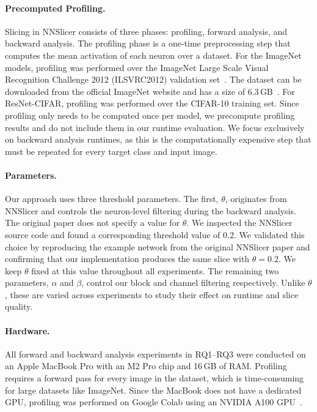 \documentclass[
12pt,
fancyheadings,
a4paper,
twoside,
BCOR=0.7cm,
nobcorignoretitle,
grayscalebody,
]{stsreprt}
\begin{document}
\paragraph{Precomputed Profiling.}
Slicing in NNSlicer consists of three phases: profiling, forward analysis, and backward analysis.
The profiling phase is a one-time preprocessing step that computes the mean activation of each
neuron over a dataset.
For the ImageNet models, profiling was performed over the ImageNet Large Scale Visual Recognition
Challenge 2012 (ILSVRC2012) validation set~\cite{deng2009imagenet, russakovsky2015imagenet}.
The dataset can be downloaded from the official ImageNet website and has a size of
6.3\,GB~\cite{imagenet2012}.
For ResNet-CIFAR, profiling was performed over the CIFAR-10 training set.
Since profiling only needs to be computed once per model, we precompute profiling results and do
not include them in our runtime evaluation.
We focus exclusively on backward analysis runtimes, as this is the computationally expensive step
that must be repeated for every target class and input image.

\paragraph{Parameters.}
Our approach uses three threshold parameters.
The first, $\theta$, originates from NNSlicer and controls the neuron-level filtering during the
backward analysis.
The original paper does not specify a value for $\theta$.
We inspected the NNSlicer source code and found a corresponding threshold value of $0.2$.
We validated this choice by reproducing the example network from the original NNSlicer paper and
confirming that our implementation produces the same slice with $\theta = 0.2$.
We keep $\theta$ fixed at this value throughout all experiments.
The remaining two parameters, $\alpha$ and $\beta$, control our block and channel filtering
respectively.
Unlike $\theta$, these are varied across experiments to study their effect on runtime and slice
quality.

\paragraph{Hardware.}
All forward and backward analysis experiments in RQ1--RQ3 were conducted on an Apple MacBook Pro
with an M2 Pro chip and 16\,GB of RAM.
Profiling requires a forward pass for every image in the dataset, which is time-consuming for large
datasets like ImageNet.
Since the MacBook does not have a dedicated GPU, profiling was performed on Google Colab using an
NVIDIA A100 GPU~\cite{bisong2019colab}.
\end{document}
